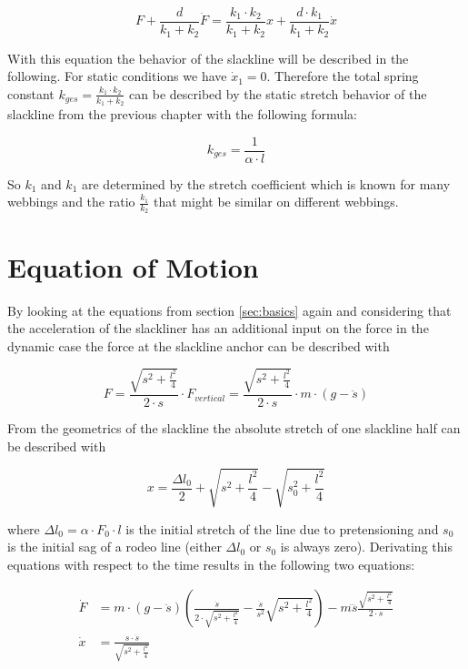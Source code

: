\begin{equation}
	F + \frac{d}{k_1 + k_2} \dot F = \frac{k_1 \cdot k_2}{k_1 + k_2} x + \frac{d \cdot k_1}{k_1 + k_2} \dot x
	\label{eqn:linearSolidModel}
\end{equation}

With this equation the behavior of the slackline will be described in the following. For static conditions we have $\dot x_1 = 0$. Therefore the total spring constant $k_{ges} = \frac{k_1 \cdot k_2}{k_1 + k_2}$ can be described by the static stretch behavior of the slackline from the previous chapter with the following formula:

\begin{equation}
	k_{ges} = \frac{1}{\alpha \cdot l}
\end{equation}

So $k_1$ and $k_1$ are determined by the stretch coefficient which is known for many webbings and the ratio $\frac{k_1}{k_2}$ that might be similar on different webbings.

\section{Equation of Motion}

By looking at the equations from section \ref{sec:basics} again and considering that the acceleration of the slackliner has an additional input on the force in the dynamic case the force at the slackline anchor can be described with

\begin{equation}
	F = \frac{\sqrt{s^2 + \frac{l^2}{4}}}{2 \cdot s} \cdot F_{vertical} = \frac{\sqrt{s^2 + \frac{l^2}{4}}}{2 \cdot s} \cdot m\cdot (g - \ddot s)
\end{equation}

From the geometrics of the slackline the absolute stretch of one slackline half can be described with

\begin{equation}
	x = \frac{\Delta l_0}{2} + \sqrt{s^2 + \frac{l^2}{4}} - \sqrt{s_0^2 + \frac{l^2}{4}}
\end{equation}

where $\Delta l_0 = \alpha \cdot F_0 \cdot l$ is the initial stretch of the line due to pretensioning and $s_0$ is the initial sag of a rodeo line (either $\Delta l_0$ or $s_0$ is always zero). Derivating this equations with respect to the time results in the following two equations:

\begin{align}
	\dot F &=  m \cdot (g - \ddot s) \left( \frac{\dot s}{2 \cdot \sqrt{s^2 + \frac{l^2}{4}}} - \frac{\dot s}{s^2} \sqrt{s^2 + \frac{l^2}{4}} \right) - m \dddot s \frac{\sqrt{s^2 + \frac{l^2}{4}}}{2 \cdot s} \\
	\dot x &= \frac{s \cdot \dot s}{\sqrt{s^2 + \frac{l^2}{4}}}
\end{align}

